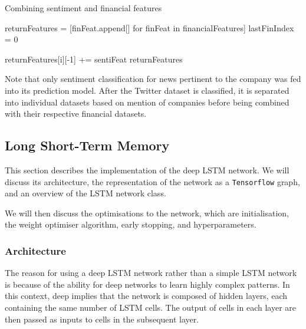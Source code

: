 \documentclass[12pt,a4paper,twoside,openright]{report}
\begin{document}
\begin{algorithm}[H]
\caption{Combining sentiment and financial features}\label{alg:combine}
\begin{algorithmic}
	\item[]
	\item[]
	\State returnFeatures = [finFeat.append[] for finFeat in financialFeatures]
	\State lastFinIndex = 0
				\item[]
				\item[]
				\State returnFeatures[i][-1] += sentiFeat
				\Break
			\EndIf
		\EndFor
	\EndFor
	\State \Return returnFeatures
\EndFunction
\end{algorithmic}
\end{algorithm}

Note that only sentiment classification for news pertinent to the company was fed into its
prediction model. After the Twitter dataset is classified, it is
separated into individual datasets based on mention of companies before being
combined with their respective financial datasets.

\subsection{Long Short-Term Memory}
\label{sec:ImplLSTM}

This section describes the implementation of the deep LSTM network.
We will discuss its architecture, the representation
of the network as a \texttt{Tensorflow} graph, and an overview of the LSTM
network class.

We will then discuss the optimisations to the network, which are initialisation,
the weight optimiser algorithm, early stopping, and hyperparameters.

\subsubsection{Architecture}
The reason for using a deep LSTM network rather than a simple LSTM network is because of the
ability for deep networks to learn highly complex patterns. In this context, deep implies that
the network is composed of hidden layers, each containing the same number of LSTM cells.
The output of cells in each layer are then passed as inputs to cells in the subsequent layer.
\end{document}
